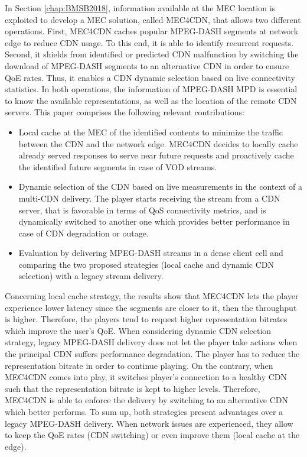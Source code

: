 In Section \ref{chap:BMSB2018}, information available at the MEC location is exploited to develop a MEC solution, called MEC4CDN, that allows two different operations. First, MEC4CDN caches popular MPEG-DASH segments at network edge to reduce CDN usage. To this end, it is able to identify recurrent requests. Second, it shields from identified or predicted CDN malfunction by switching the download of MPEG-DASH segments to an alternative CDN in order to ensure QoE rates. Thus, it enables a CDN dynamic selection based on live connectivity statistics. In both operations, the information of MPEG-DASH MPD is essential to know the available representations, as well as the location of the remote CDN servers. This paper comprises the following relevant contributions:
\begin{itemize}
	\item Local cache at the MEC of the identified contents to minimize the traffic between the CDN and the network edge. MEC4CDN decides to locally cache already served responses to serve near future requests and proactively cache the identified future segments in case of VOD streams.
	\item Dynamic selection of the CDN based on live measurements in the context of a multi-CDN delivery. The player starts receiving the stream from a CDN server, that is favorable in terms of QoS connectivity metrics, and is dynamically switched to another one which provides better performance in case of CDN degradation or outage.
	\item Evaluation by delivering MPEG-DASH streams in a dense client cell
	and comparing the two proposed strategies (local cache and dynamic CDN selection) with a legacy stream delivery.
\end{itemize}
Concerning local cache strategy, the results show that MEC4CDN lets the player experience lower latency since the segments are closer to it, then the throughput is higher. Therefore, the players tend to request higher representation bitrates which improve the user's QoE.
When considering dynamic CDN selection strategy, legacy MPEG-DASH delivery does not let the player take actions when the principal CDN suffers performance degradation. The player has to reduce the representation bitrate in order to continue playing. On the contrary, when MEC4CDN comes into play, it switches player's connection to a healthy CDN such that the representation bitrate is kept to higher levels. Therefore, MEC4CDN is able to enforce the delivery by switching to an alternative CDN which better performs.
To sum up, both strategies present advantages over a legacy MPEG-DASH delivery. When network issues are experienced, they allow to keep the QoE rates (CDN switching) or even improve them (local cache at the edge).